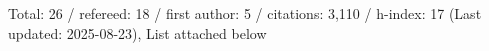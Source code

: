 Total: 26 / refereed: 18 / first author: 5 / citations: 3,110 / h-index: 17 (Last updated: 2025-08-23), List attached below